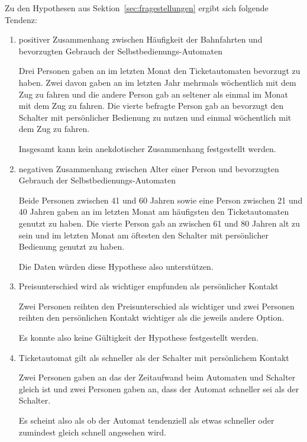 \documentclass[]{article}
\begin{document}
Zu den Hypothesen aus Sektion~\ref{sec:fragestellungen} ergibt sich folgende Tendenz:

\begin{enumerate}[label={H\arabic*: }]
	\item positiver Zusammenhang zwischen Häufigkeit der Bahnfahrten und bevorzugten Gebrauch der Selbstbedienungs-Automaten
	
	Drei Personen gaben an im letzten Monat den Ticketautomaten bevorzugt zu haben. Zwei davon gaben an im letzten Jahr mehrmals wöchentlich mit dem Zug zu fahren und die andere Person gab an seltener als einmal im Monat mit dem Zug zu fahren. Die vierte befragte Person gab an bevorzugt den Schalter mit persönlicher Bedienung zu nutzen und einmal wöchentlich mit dem Zug zu fahren.
	
	Insgesamt kann kein anekdotischer Zusammenhang festgestellt werden.
	
	\item negativen Zusammenhang zwischen Alter einer Person und bevorzugten Gebrauch der Selbstbedienungs-Automaten
	
	Beide Personen zwischen 41 und 60 Jahren sowie eine Person zwischen 21 und 40 Jahren gaben an im letzten Monat am häufigsten den Ticketautomaten genutzt zu haben. Die vierte Person gab an zwischen 61 und 80 Jahren alt zu sein und im letzten Monat am öftesten den Schalter mit persönlicher Bedienung genutzt zu haben.
	
	Die Daten würden diese Hypothese also unterstützen.
	
	\item Preisunterschied wird als wichtiger empfunden als persönlicher Kontakt
	
	Zwei Personen reihten den Preisunterschied als wichtiger und zwei Personen reihten den persönlichen Kontakt wichtiger als die jeweils andere Option.
	
	Es konnte also keine Gültigkeit der Hypothese festgestellt werden.
	
	\item Ticketautomat gilt als schneller als der Schalter mit persönlichem Kontakt
	
	Zwei Personen gaben an das der Zeitaufwand beim Automaten und Schalter gleich ist und zwei Personen gaben an, dass der Automat schneller sei als der Schalter.
	
	Es scheint also als ob der Automat tendenziell als etwas schneller oder zumindest gleich schnell angesehen wird.
\end{enumerate}



\end{document}
